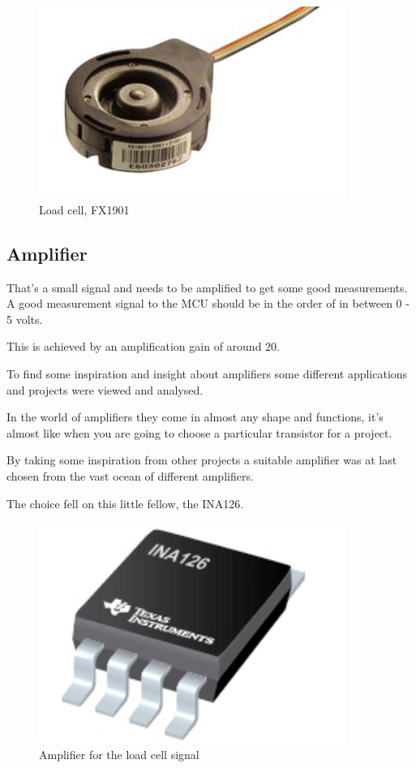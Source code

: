  \begin{figure}[H]
\begin{center}
	\includegraphics[width = 10cm]{Figures/Load_cell.png}
	\caption{Load cell, FX1901}
	\label{Load_cell}
\end{center}
\end{figure}



\subsection{Amplifier}



That’s a small signal and needs to be amplified to get some good measurements. A good measurement signal to the MCU should be in the order of in between 0 - 5 volts. 

This is achieved by an amplification gain of around 20. 

To find some inspiration and insight about amplifiers some different applications and projects were viewed and analysed. 

In the world of amplifiers they come in almost any shape and functions, it's almost like when you are going to choose a particular transistor for a project.


By taking some inspiration from other projects a suitable amplifier was at last chosen from the vast ocean of different amplifiers. 


The choice fell on this little fellow, the INA126. 

\begin{figure}[H]
\begin{center}
	\includegraphics[width = 10cm]{Figures/INA126.png}
	\caption{Amplifier for the load cell signal}
	\label{INA126}
\end{center}
\end{figure}


